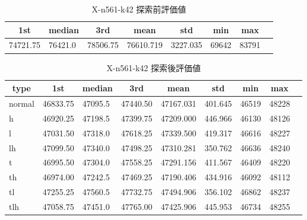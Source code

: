 \begin{table}[htbp]
    \caption{X-n561-k42 探索前評価値}
    \begin{tabular}{|l|l|l|l|l|l|l|l|}\hline
    \multicolumn{1}{|c|}{\textbf{1st}}
    &\multicolumn{1}{c|}{\textbf{median}}
    &\multicolumn{1}{c|}{\textbf{3rd}}
    &\multicolumn{1}{c|}{\textbf{mean}}
    &\multicolumn{1}{c|}{\textbf{std}}
    &\multicolumn{1}{c|}{\textbf{min}}
    &\multicolumn{1}{c|}{\textbf{max}}\\\hline
	74721.75 & 76421.0 & 78506.75 & 76610.719 & 3227.035 & 69642 & 83791\\\hline
	\end{tabular}
\end{table}
\begin{table}[htbp]
    \caption{X-n561-k42 探索後評価値}
    \begin{tabular}{|l|l|l|l|l|l|l|l|l|}\hline
    \multicolumn{1}{|c|}{\textbf{type}}
    &\multicolumn{1}{|c|}{\textbf{1st}}
    &\multicolumn{1}{c|}{\textbf{median}}
    &\multicolumn{1}{c|}{\textbf{3rd}}
    &\multicolumn{1}{c|}{\textbf{mean}}
    &\multicolumn{1}{c|}{\textbf{std}}
    &\multicolumn{1}{c|}{\textbf{min}}
    &\multicolumn{1}{c|}{\textbf{max}}\\\hline
	normal & 46833.75 & 47095.5 & 47440.50 & 47167.031 & 401.645 & 46519 & 48228\\\hline
	h & 46920.25 & 47198.5 & 47399.75 & 47209.000 & 446.966 & 46130 & 48126\\\hline
	l & 47031.50 & 47318.0 & 47618.25 & 47339.500 & 419.317 & 46616 & 48227\\\hline
	lh & 47099.50 & 47340.0 & 47498.25 & 47310.281 & 350.762 & 46636 & 48240\\\hline
	t & 46995.50 & 47304.0 & 47558.25 & 47291.156 & 411.567 & 46409 & 48220\\\hline
	th & 46974.00 & 47242.5 & 47469.25 & 47190.406 & 434.916 & 46092 & 48112\\\hline
	tl & 47255.25 & 47560.5 & 47732.75 & 47494.906 & 356.102 & 46862 & 48237\\\hline
	tlh & 47058.75 & 47451.0 & 47765.00 & 47425.906 & 445.953 & 46734 & 48255\\\hline
	\end{tabular}
\end{table}
